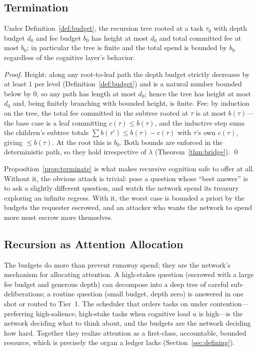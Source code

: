 \subsection{Termination}

\begin{proposition}
\label{prop:terminate}
Under Definition~\ref{def:budget}, the recursion tree rooted at a task $\tau_0$ with depth budget $d_0$ and fee budget $b_0$ has height at most $d_0$ and total committed fee at most $b_0$; in particular the tree is finite and the total spend is bounded by $b_0$ regardless of the cognitive layer's behavior.
\end{proposition}

\begin{proof}
Height: along any root-to-leaf path the depth budget strictly decreases by at least $1$ per level (Definition~\ref{def:budget}) and is a natural number bounded below by $0$, so any path has length at most $d_0$; hence the tree has height at most $d_0$ and, being finitely branching with bounded height, is finite. Fee: by induction on the tree, the total fee committed in the subtree rooted at $\tau$ is at most $b(\tau)$---the base case is a leaf committing $c(\tau) \le b(\tau)$, and the inductive step sums the children's subtree totals $\sum b(\tau') \le b(\tau) - c(\tau)$ with $\tau$'s own $c(\tau)$, giving $\le b(\tau)$. At the root this is $b_0$. Both bounds are enforced in the deterministic path, so they hold irrespective of $\lambda$ (Theorem~\ref{thm:bridge}). \qed
\end{proof}

Proposition~\ref{prop:terminate} is what makes recursive cognition safe to offer at all. Without it, the obvious attack is trivial: pose a question whose ``best answer'' is to ask a slightly different question, and watch the network spend its treasury exploring an infinite regress. With it, the worst case is bounded a priori by the budgets the requester escrowed, and an attacker who wants the network to spend more must escrow more themselves.

\subsection{Recursion as Attention Allocation}

The budgets do more than prevent runaway spend; they are the network's mechanism for allocating attention. A high-stakes question (escrowed with a large fee budget and generous depth) can decompose into a deep tree of careful sub-deliberations; a routine question (small budget, depth zero) is answered in one shot or routed to Tier~1. The scheduler that orders tasks on \AChain{} under contention---preferring high-salience, high-stake tasks when cognitive load $u$ is high---is the network deciding what to think about, and the budgets are the network deciding how hard. Together they realize attention as a first-class, accountable, bounded resource, which is precisely the organ a ledger lacks (Section~\ref{sec:defining}).

